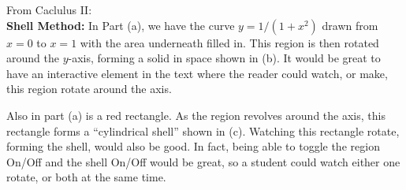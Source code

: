 \documentclass[10pt]{article}
\begin{document}
From Caclulus II:\\

\textbf{Shell Method:} In Part (a), we have the curve $y=1/(1+x^2)$ drawn from $x=0$ to $x=1$ with the area underneath filled in. This region is then rotated around the $y$-axis, forming a solid in space shown in (b). It would be great to have an interactive element in the text where the reader could watch, or make, this region rotate around the axis.

Also in part (a) is a red rectangle. As the region revolves around the axis, this rectangle forms a ``cylindrical shell'' shown in (c). Watching this rectangle rotate, forming the shell, would also be good. In fact, being able to toggle the region On/Off and the shell On/Off would be great, so a student could watch either one rotate, or both at the same time.

\end{document}
